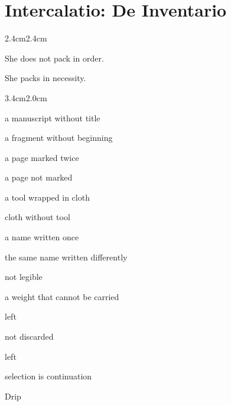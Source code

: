 
\chapter*{Intercalatio: De Inventario}


\begin{adjustwidth}{2.4cm}{2.4cm}

She does not pack in order.

\vspace{1em}

She packs in necessity.

\vspace{2em}

\end{adjustwidth}

\begin{adjustwidth}{3.4cm}{2.0cm}

\noindent a manuscript without title

\noindent a fragment without beginning

\noindent {}

\noindent a page marked twice

\noindent a page not marked

\noindent {}

\noindent a tool wrapped in cloth

\noindent cloth without tool

\noindent \logico{$\exists \land \neg$}

\noindent a name written once

\noindent the same name written differently

\noindent {}

\noindent not legible

\vspace{1em}

\noindent a weight that cannot be carried

\noindent left

\noindent not discarded

\noindent left

\vspace{1em}

\noindent {}

\noindent selection is continuation

\vspace{2em}

\end{adjustwidth}

\begin{center}
Drip
\end{center}
